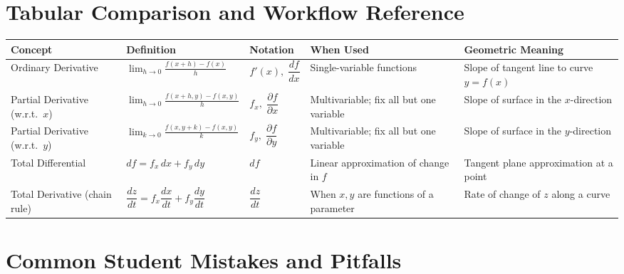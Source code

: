 \documentclass[12pt,a4paper]{article}
\begin{document}
\section{Tabular Comparison and Workflow Reference}

\begin{center}
\renewcommand{\arraystretch}{1.5}
\begin{tabular}{@{}p{3.2cm}p{3.5cm}p{2.5cm}p{2.8cm}p{3.2cm}@{}}
\toprule
\textbf{Concept} & \textbf{Definition} & \textbf{Notation} & \textbf{When Used} & \textbf{Geometric Meaning} \\
\midrule
Ordinary Derivative & \(\displaystyle\lim_{h\to 0}\frac{f(x+h)-f(x)}{h}\) & \(f'(x),\;\dfrac{df}{dx}\) & Single-variable functions & Slope of tangent line to curve \(y=f(x)\) \\
Partial Derivative (w.r.t.\ \(x\)) & \(\displaystyle\lim_{h\to 0}\frac{f(x+h,y)-f(x,y)}{h}\) & \(f_x,\;\dfrac{\partial f}{\partial x}\) & Multivariable; fix all but one variable & Slope of surface in the \(x\)-direction \\
Partial Derivative (w.r.t.\ \(y\)) & \(\displaystyle\lim_{k\to 0}\frac{f(x,y+k)-f(x,y)}{k}\) & \(f_y,\;\dfrac{\partial f}{\partial y}\) & Multivariable; fix all but one variable & Slope of surface in the \(y\)-direction \\
Total Differential & \(df = f_x\,dx + f_y\,dy\) & \(df\) & Linear approximation of change in \(f\) & Tangent plane approximation at a point \\
Total Derivative (chain rule) & \(\dfrac{dz}{dt} = f_x\dfrac{dx}{dt} + f_y\dfrac{dy}{dt}\) & \(\dfrac{dz}{dt}\) & When \(x,y\) are functions of a parameter & Rate of change of \(z\) along a curve \\
\bottomrule
\end{tabular}
\end{center}

\section{Common Student Mistakes and Pitfalls}
\end{document}
